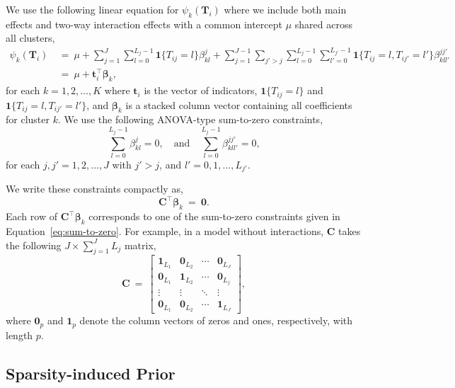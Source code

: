 \documentclass[11pt]{article}
\newcommand\bT{\bm{T}}
\newcommand\bC{\bm{C}}
\newcommand\bbeta{\bm{\beta}}
\newcommand\bzero{\bm{0}}
\newcommand\bone{\bm{1}}
\begin{document}
We use the following linear equation for $\psi_{k}(\bT_i)$ where we
include both main effects and two-way interaction effects with a
common intercept $\mu$ shared across all clusters,
\begin{align*}
\psi_{k}(\bT_i)& \ =\ \mu + \sum_{j=1}^J \sum_{l =0}^{L_j-1} 
\mathbf{1}\{T_{ij} = l\} \beta^j_{kl} + \sum_{j=1}^{J-1} \sum_{j' >
  j} \sum_{l=0}^{L_j-1} \sum_{l' = 0}^{L_{j'}-1} \mathbf{1}\{T_{ij} = l,
T_{ij'} = l'\} \beta^{jj'}_{kll'}\\
&\ =\ \mu + \bm{t}_i^\top\bbeta_k, 
\end{align*}
for each $k=1,2,\ldots,K$ where $\bm{t}_i$ is the vector of
indicators, $\mathbf{1}\{T_{ij} = l\}$ and
$\mathbf{1}\{T_{ij} = l, T_{ij'} = l'\}$, and $\bbeta_k$ is a stacked
column vector containing all coefficients for cluster $k$.  We use the
following ANOVA-type sum-to-zero constraints,
\begin{equation}
  \sum_{l =0}^{L_j-1} \beta^j_{kl} = 0, \quad \text{and} \quad
  \sum_{l=0}^{L_{j}-1} \beta^{jj'}_{kll'} = 0, \label{eq:sum-to-zero}
\end{equation}
for each $j,j'=1,2,\ldots,J$ with $j' > j$, and
$l'=0,1,\ldots,L_{j'}$. 

We write these constraints compactly as,
\begin{equation}
  \bC^\top \bbeta_k \ = \ \bm{0}. \label{eq:constraint}
\end{equation}
Each row of $\bC^\top \bbeta_k$
corresponds to one of the sum-to-zero constraints given in
Equation~\eqref{eq:sum-to-zero}.  For example, in a model without
interactions, $\bm{C}$ takes the following $J \times \sum_{j=1}^J L_j$
matrix,
\begin{equation*}
  \bC \ = \ \begin{bmatrix} \bm{1}_{L_1} & \bm{0}_{L_2} & \cdots &
    \bm{0}_{L_J}
    \\ \bm{0}_{L_1} & \bm{1}_{L_2} & \cdots & \bm{0}_{L_j} \\
    \vdots & \vdots & \ddots & \vdots \\ \bm{0}_{L_1} &
    \bm{0}_{L_2}
    & \cdots &
    \bm{1}_{L_J}
  \end{bmatrix}, 
\end{equation*}
where $\bzero_p$ and $\bone_p$ denote the column vectors of zeros and
ones, respectively, with length $p$.  

\subsection{Sparsity-induced Prior}
\end{document}
